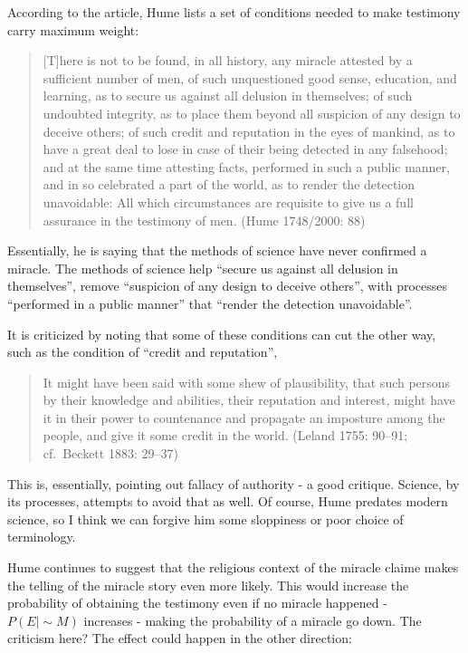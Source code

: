 According to the article, Hume lists a set of conditions needed to make
testimony carry maximum weight:

\begin{quote}
{[}T{]}here is not to be found, in all history, any miracle attested by
a sufficient number of men, of such unquestioned good sense, education,
and learning, as to secure us against all delusion in themselves; of
such undoubted integrity, as to place them beyond all suspicion of any
design to deceive others; of such credit and reputation in the eyes of
mankind, as to have a great deal to lose in case of their being detected
in any falsehood; and at the same time attesting facts, performed in
such a public manner, and in so celebrated a part of the world, as to
render the detection unavoidable: All which circumstances are requisite
to give us a full assurance in the testimony of men. (Hume 1748/2000:
88)
\end{quote}

Essentially, he is saying that the methods of science have never
confirmed a miracle. The methods of science help ``secure us against all
delusion in themselves'', remove ``suspicion of any design to deceive
others'', with processes ``performed in a public manner'' that ``render
the detection unavoidable''.

It is criticized by noting that some of these conditions can cut the
other way, such as the condition of ``credit and reputation'',

\begin{quote}
It might have been said with some shew of plausibility, that such
persons by their knowledge and abilities, their reputation and interest,
might have it in their power to countenance and propagate an imposture
among the people, and give it some credit in the world. (Leland 1755:
90--91; cf.~Beckett 1883: 29--37)
\end{quote}

This is, essentially, pointing out fallacy of authority - a good
critique. Science, by its processes, attempts to avoid that as well. Of
course, Hume predates modern science, so I think we can forgive him some
sloppiness or poor choice of terminology.

Hume continues to suggest that the religious context of the miracle
claime makes the telling of the miracle story even more likely. This
would increase the probability of obtaining the testimony even if no
miracle happened - \(P(E|\sim\!M)\) increases - making the probability
of a miracle go down. The criticism here? The effect could happen in the
other direction:

